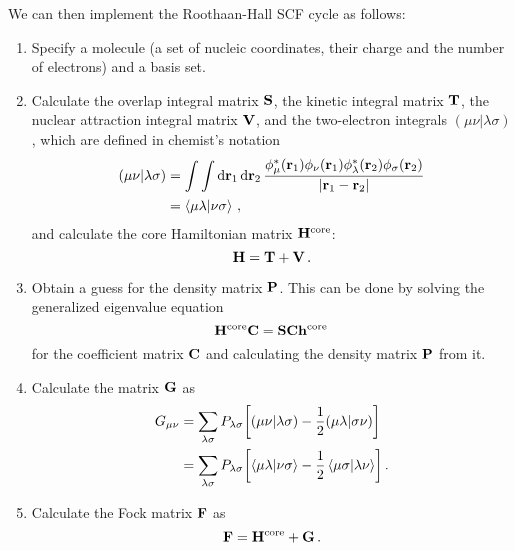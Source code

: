 \documentclass[12pt]{article}
\begin{document}
    We can then implement the Roothaan-Hall SCF cycle as follows:
    \begin{enumerate}
        \item Specify a molecule (a set of nucleic coordinates, their charge and the number of electrons) and a basis set.

        \item Calculate the overlap integral matrix $\vb{S}$, the kinetic integral matrix $\vb{T}$, the nuclear attraction integral matrix $\vb{V}$, and the two-electron integrals $(\mu \nu|\lambda \sigma)$, which are defined in chemist's notation
        \begin{align}
            (\mu \nu|\lambda \sigma) &= \int \int \dd{\vb{r}_1} \dd{\vb{r}_2} \frac{\phi_\mu^*(\vb{r}_1) \phi_\nu(\vb{r}_1) \phi_\lambda^*(\vb{r}_2) \phi_\sigma(\vb{r}_2)}{|\vb{r}_1 - \vb{r}_2|} \\
            &= \braket{\mu \lambda}{\nu \sigma} \thinspace ,
        \end{align}
        and calculate the core Hamiltonian matrix $\vb{H}^\text{core}$:
        \begin{equation}
            \vb{H} = \vb{T} + \vb{V} \thinspace .
        \end{equation}

        \item Obtain a guess for the density matrix $\vb{P}$. This can be done by solving the generalized eigenvalue equation
        \begin{equation}
            \vb{H}^\text{core} \vb{C} = \vb{S} \vb{C} \vb{h}^\text{core}
        \end{equation}
        for the coefficient matrix $\vb{C}$ and calculating the density matrix $\vb{P}$ from it.

        \item \label{item:scf:g_matrix}  Calculate the matrix $\vb{G}$ as
        \begin{align}
            G_{\mu \nu} &= \sum_{\lambda \sigma} P_{\lambda \sigma} \qty[ (\mu \nu|\lambda \sigma) - \frac{1}{2} (\mu \lambda|\sigma \nu)] \\
            &= \sum_{\lambda \sigma} P_{\lambda \sigma} \qty[ \braket{\mu \lambda}{\nu \sigma} - \frac{1}{2} \braket{\mu \sigma}{\lambda \nu}] \thinspace .
        \end{align}

        \item Calculate the Fock matrix $\vb{F}$ as
        \begin{equation} \label{eq:fock_matrix}
            \vb{F} = \vb{H}^\text{core} + \vb{G} \thinspace .
        \end{equation}


\end{enumerate}
\end{document}
